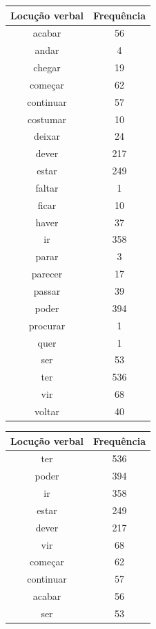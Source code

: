 \documentclass[output=paper,colorlinks,citecolor=brown]{langscibook}
\begin{document}
	\begin{table}[]
		\parbox{.45\linewidth}{
			\centering
			\begin{tabular}{|c|c|}
				\hline
				\textbf{Locução verbal} & \textbf{Frequência} \\\hline
				acabar & 56\\\hline
				andar & 4\\\hline
				chegar & 19\\\hline
				começar & 62\\\hline
				continuar & 57\\\hline
				costumar & 10\\\hline
				deixar & 24\\\hline
				dever & 217\\\hline
				estar & 249\\\hline
				faltar & 1\\\hline
				ficar & 10\\\hline
				haver & 37\\\hline
				ir & 358\\\hline
				parar & 3\\\hline
				parecer & 17\\\hline
				passar & 39\\\hline
				poder & 394\\\hline
				procurar & 1\\\hline
				quer & 1\\\hline
				ser & 53\\\hline
				ter & 536\\\hline
				vir & 68\\\hline
				voltar & 40\\\hline
			\end{tabular}
		}
		\hfill
		\parbox{.45\linewidth}{
			\centering
			\begin{tabular}{|c|c|}
				\hline
				\textbf{Locução verbal} & \textbf{Frequência} \\\hline
				ter & 536\\\hline
				poder & 394\\\hline
				ir & 358\\\hline
				estar & 249\\\hline
				dever & 217\\\hline
				vir & 68\\\hline
				começar & 62\\\hline
				continuar & 57\\\hline
				acabar & 56\\\hline
				ser & 53\\\hline

\end{tabular}}
\end{table}
\end{document}
